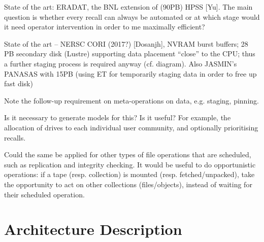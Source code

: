 \documentclass{../../template/esiwace-report}
\begin{document}
State of the art: ERADAT, the BNL extension of (90PB) HPSS [Yu].  The main question is whether every recall can always
be automated or at which stage would it need operator intervention in order to me maximally efficient?

State of the art – NERSC CORI (2017?) [Dosanjh], NVRAM burst buffers; 28 PB secondary disk (Lustre) supporting data
placement “close” to the CPU; thus a further staging process is required anyway (cf. diagram).  Also JASMIN’s PANASAS
with 15PB (using ET for temporarily staging data in order to free up fast disk)

Note the follow-up requirement on meta-operations on data, e.g. staging, pinning.


Is it necessary to generate models for this? Is it useful?  For example, the allocation of drives to each individual
user community, and optionally prioritising recalls.

Could the same be applied for other types of file operations that are scheduled, such as replication and integrity
checking.  It would be useful to do opportunistic operations: if a tape (resp. collection) is mounted
(resp. fetched/unpacked), take the opportunity to act on other collections (files/objects), instead of waiting for their
scheduled operation.




\chapter{Architecture Description} 
\end{document}
